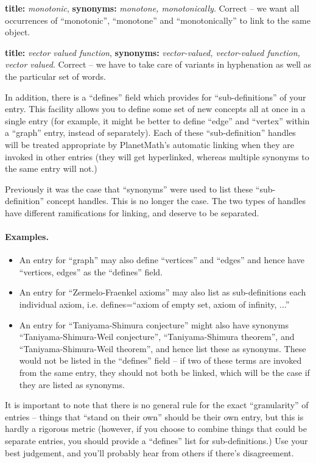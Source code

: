 {\bf title:} \emph{monotonic}, {\bf synonyms:} \emph{monotone,
monotonically}. Correct -- we want all occurrences of ``monotonic'',
``monotone'' and ``monotonically'' to link to the same object.

{\bf title:} \emph{vector valued function}, {\bf synonyms:} \emph{vector-valued,
vector-valued function, vector valued}. Correct -- we have to take care
of variants in hyphenation as well as the particular set of words.

In addition, there is a ``defines'' field which provides for
``sub-definitions'' of your entry. This facility allows you to define
some set of new concepts all at once in a single entry (for example,
it might be better to define ``edge'' and ``vertex'' within a
``graph'' entry, instead of separately). Each of these
``sub-definition'' handles will be treated appropriate by PlanetMath's
automatic linking when they are invoked in other entries (they will
get hyperlinked, whereas multiple synonyms to the same entry will
not.)

Previously it was the case that ``synonyms'' were used to list these
``sub-definition'' concept handles. This is no longer the case. The
two types of handles have different ramifications for linking, and
deserve to be separated.

\paragraph{Examples.}
\begin{itemize}
\item An entry for ``graph'' may also define ``vertices'' and
``edges'' and hence have ``vertices, edges'' as the ``defines''
field.
\item An entry for ``Zermelo-Fraenkel axioms'' may also list as
sub-definitions each individual axiom, i.e. defines=``axiom of empty
set, axiom of infinity, ...''
\item An entry for ``Taniyama-Shimura conjecture'' might also have
synonyms ``Taniyama-Shimura-Weil conjecture'', ``Taniyama-Shimura
theorem'', and ``Taniyama-Shimura-Weil theorem'', and hence list
these as synonyms. These would not be listed in the ``defines''
field -- if two of these terms are invoked from the same entry, they
should not both be linked, which will be the case if they are listed
as synonyms.
\end{itemize}
It is important to note that there is no general rule for the exact
``granularity'' of entries -- things that ``stand on their own''
should be their own entry, but this is hardly a rigorous metric
(however, if you choose to combine things that could be separate
entries, you should provide a ``defines'' list for sub-definitions.)
Use your best judgement, and you'll probably hear from others if
there's disagreement.

